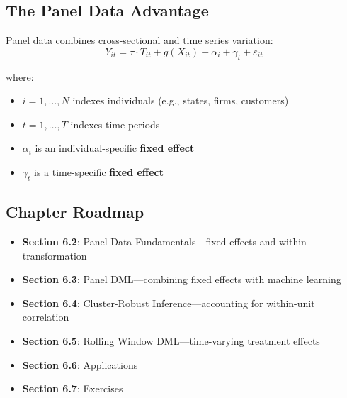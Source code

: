 \subsection{The Panel Data Advantage}

Panel data combines cross-sectional and time series variation:
\begin{equation}
Y_{it} = \tau \cdot T_{it} + g(X_{it}) + \alpha_i + \gamma_t + \varepsilon_{it}
\end{equation}

where:
\begin{itemize}
    \item $i = 1, \ldots, N$ indexes individuals (e.g., states, firms, customers)
    \item $t = 1, \ldots, T$ indexes time periods
    \item $\alpha_i$ is an individual-specific \textbf{fixed effect}
    \item $\gamma_t$ is a time-specific \textbf{fixed effect}
\end{itemize}


\subsection{Chapter Roadmap}

\begin{itemize}
    \item \textbf{Section 6.2}: Panel Data Fundamentals---fixed effects and within transformation
    \item \textbf{Section 6.3}: Panel DML---combining fixed effects with machine learning
    \item \textbf{Section 6.4}: Cluster-Robust Inference---accounting for within-unit correlation
    \item \textbf{Section 6.5}: Rolling Window DML---time-varying treatment effects
    \item \textbf{Section 6.6}: Applications
    \item \textbf{Section 6.7}: Exercises
\end{itemize}

